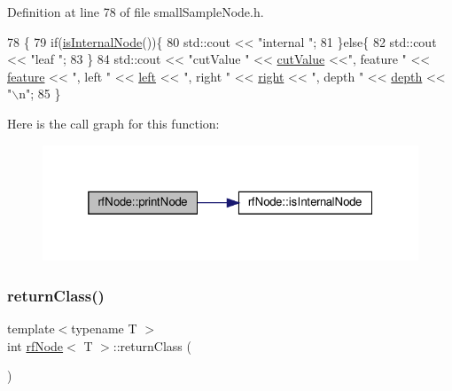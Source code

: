 Definition at line 78 of file small\+Sample\+Node.\+h.


\begin{DoxyCode}
78                                 \{
79             \textcolor{keywordflow}{if}(\hyperlink{classrfNode_a1df9f7bc841c6df1ef5aa67a72c6d09c}{isInternalNode}())\{
80                 std::cout << \textcolor{stringliteral}{"internal "};
81             \}\textcolor{keywordflow}{else}\{
82                 std::cout << \textcolor{stringliteral}{"leaf "};
83             \}
84             std::cout << \textcolor{stringliteral}{"cutValue "} << \hyperlink{classrfNode_a49b9c55f11f1f3898eb7811f78f68796}{cutValue} <<\textcolor{stringliteral}{", feature "} << 
      \hyperlink{classrfNode_ac8c0dd14a4e53f9b831f326f5d197e0e}{feature} << \textcolor{stringliteral}{", left "} << \hyperlink{classrfNode_ac8e195fc3d8a9647f10a42153d76119f}{left} << \textcolor{stringliteral}{", right "} << \hyperlink{classrfNode_a01e57d43ac8af60d16880544e99ed965}{right} << \textcolor{stringliteral}{", depth "} << 
      \hyperlink{classrfNode_a7cb8fb854d8ec90635bd7207d8b8c31e}{depth} << \textcolor{stringliteral}{"\(\backslash\)n"};
85         \}
\end{DoxyCode}
Here is the call graph for this function\+:
\nopagebreak
\begin{figure}[H]
\begin{center}
\leavevmode
\includegraphics[width=325pt]{classrfNode_afaa1b6e358070f895504f4faaefe5f37_cgraph}
\end{center}
\end{figure}
\mbox{\label{classrfNode_aa43edab3527a456028116928e83b123d}} 
\subsubsection{\texorpdfstring{return\+Class()}{returnClass()}\hspace{0.1cm}{\footnotesize\ttfamily [1/2]}}
{\footnotesize\ttfamily template$<$typename T $>$ \\
int \hyperlink{classrfNode}{rf\+Node}$<$ T $>$\+::return\+Class (\begin{DoxyParamCaption}{ }\end{DoxyParamCaption})\hspace{0.3cm}{\ttfamily [inline]}}



